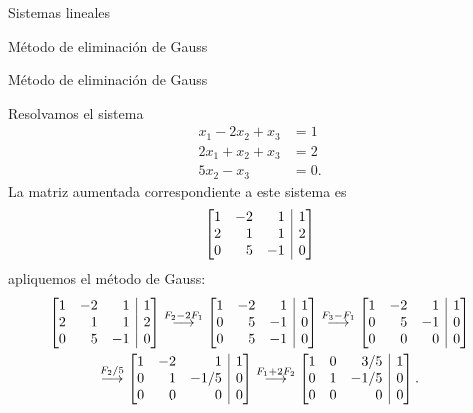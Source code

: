 \begin{chapter}{Sistemas lineales}
\begin{section}{Método de eliminación de Gauss }
\begin{subsection}{Método de eliminación de Gauss}
                \begin{ejemplo*} Resolvamos el sistema
                    \begin{align*}
                    x_1 -2x_2 + x_3  &= 1\\
                    2x_1 +x_2 + x_3  &= 2\\
                    5x_2 - x_3  &= 0.
                    \end{align*}
                    La matriz  aumentada correspondiente a este sistema es
                    \begin{equation*}
                     \left[\begin{array}{@{}*{3}{r}|r@{}} 
                     1 & -2 & 1 &  1 \\ 2 & 1 & 1 &  2 \\ 0 & 5 & -1 &  0 
                    \end{array}\right]
                    \end{equation*}
                    apliquemos el método de Gauss:
                    \begin{multline*}
                    \left[\begin{array}{@{}*{3}{r}|r@{}}1 & -2 & 1 &  1 \\ 2 & 1 & 1 &  2 \\	0 & 5 & -1 &  0  \end{array}\right]
                    \stackrel{F_2 - 2F_1}{\longrightarrow} 
                    \left[\begin{array}{@{}*{3}{r}|r@{}}1 & -2 & 1 &  1 \\ 0 & 5 & -1 &  0 \\	0 & 5 & -1 &  0  \end{array}\right]
                    \stackrel{F_3-F_1}{\longrightarrow} 
                    \left[\begin{array}{@{}*{3}{r}|r@{}}1 & -2 & 1 &  1 \\ 0 & 5 & -1 &  0 \\	0 & 0 & 0 & 0  \end{array}\right]
                    \\
                    \stackrel{F_2/5}{\longrightarrow} 
                    \left[\begin{array}{@{}*{3}{r}|r@{}}1 & -2 & 1 &  1 \\ 0 & 1 & -1/5 &  0 \\	0 & 0 & 0 &  0  \end{array}\right]
                    \stackrel{F_1+2 F_2}{\longrightarrow} 
                    \left[\begin{array}{@{}*{3}{r}|r@{}}1 & 0 & 3/5 & 1 \\ 0 & 1 & -1/5 &  0 \\	0 & 0 & 0 &  0  \end{array}\right].

\end{multline*}
\end{ejemplo*}
\end{subsection}
\end{section}
\end{chapter}
